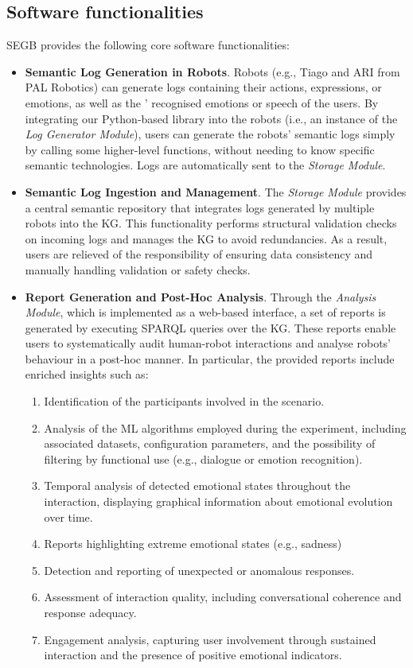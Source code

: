 \documentclass[preprint,12pt, a4paper]{elsarticle}
\begin{document}
\subsection{Software functionalities}

\ac{SEGB} provides the following core software functionalities:

\begin{itemize}

\item {\bf Semantic Log Generation in Robots}. Robots (e.g., Tiago and ARI from PAL Robotics) can generate logs containing their actions, expressions, or emotions, as well as the ' recognised emotions or speech of the users. By integrating our Python-based library into the robots (i.e., an instance of the \textit{Log Generator Module}), users can generate the robots' semantic logs simply by calling some higher-level functions, without needing to know specific semantic technologies. Logs are automatically sent to the \textit{Storage Module}.


\item {\bf Semantic Log Ingestion and Management}. The \textit{Storage Module} provides a central semantic repository that integrates logs generated by multiple robots into the \ac{KG}. This functionality performs structural validation checks on incoming logs and manages the \ac{KG} to avoid redundancies. As a result, users are relieved of the responsibility of ensuring data consistency and manually handling validation or safety checks.


\item {\bf Report Generation and Post-Hoc Analysis}. Through the \textit{Analysis Module}, which is implemented as a web-based interface, a set of reports is generated by executing SPARQL queries over the \ac{KG}. These reports enable users to systematically audit human-robot interactions and analyse robots' behaviour in a post-hoc manner. In particular, the provided reports include enriched insights such as:
\begin{enumerate}
    \item Identification of the participants involved in the scenario.
    \item Analysis of the \ac{ML} algorithms employed during the experiment, including associated datasets, configuration parameters, and the possibility of filtering by functional use (e.g., dialogue or emotion recognition).
    \item Temporal analysis of detected emotional states throughout the interaction, displaying graphical information about emotional evolution over time.
    \item Reports highlighting extreme emotional states (e.g., sadness)
    \item Detection and reporting of unexpected or anomalous responses.
    \item Assessment of interaction quality, including conversational coherence and response adequacy.
    \item Engagement analysis, capturing user involvement through sustained interaction and the presence of positive emotional indicators.
\end{enumerate}



\end{itemize}
\end{document}
